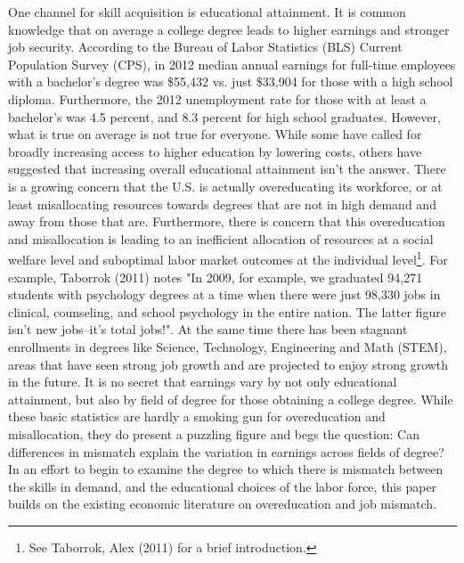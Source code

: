\documentclass[11pt]{article}
\theoremstyle{definition}
\begin{document}
\vspace{2mm}
One channel for skill acquisition is educational attainment.  It is common knowledge that on average a college degree leads to higher earnings and stronger job security.  According to the Bureau of Labor Statistics (BLS) Current Population Survey (CPS), in 2012 median annual earnings for full-time employees with a bachelor's degree was \$55,432 vs. just \$33,904 for those with a high school diploma. Furthermore, the 2012 unemployment rate for those with at least a bachelor's was 4.5 percent, and 8.3 percent for high school graduates.  However, what is true on average is not true for everyone.  While some have called for broadly increasing access to higher education by lowering costs, others have suggested that increasing overall educational attainment isn't the answer.  There is a growing concern that the U.S. is actually overeducating its workforce, or at least misallocating resources towards degrees that are not in high demand and away from those that are.  Furthermore, there is concern that this overeducation and misallocation is leading to an inefficient allocation of resources at a social welfare level and suboptimal labor market outcomes at the individual level\footnote{See Taborrok, Alex (2011) for a brief introduction.}.  For example, Taborrok (2011) notes "In 2009, for example, we graduated 94,271 students with psychology degrees at a time when there were just 98,330 jobs in clinical, counseling, and school psychology in the entire nation.  The latter figure isn't new jobs--it's total jobs!".  At the same time there has been stagnant enrollments in degrees like Science, Technology, Engineering and Math (STEM), areas that have seen strong job growth and are projected to enjoy strong growth in the future.   It is no secret that earnings vary by not only educational attainment, but also by field of degree for those obtaining a college degree.  While these basic statistics are hardly a smoking gun for overeducation and misallocation, they do present a puzzling figure and begs the question:  Can differences in mismatch explain the variation in earnings across fields of degree?  In an effort to begin to examine the degree to which there is mismatch between the skills in demand, and the educational choices of the labor force, this paper builds on the existing economic literature on overeducation and job mismatch.  
\end{document}
